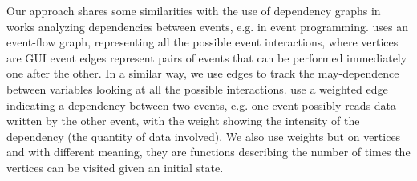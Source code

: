 %
Our approach shares some similarities with the use of dependency graphs in works analyzing dependencies between events, e.g. in event programming. \citet{memon2007event} uses an event-flow graph, representing all the possible event interactions, where vertices are GUI event edges represent pairs of events that can be performed immediately one after the other. In a similar way, we use edges to track the may-dependence between variables looking at all the possible interactions. 
\citet{arlt2012lightweight} use a weighted edge indicating a dependency between two events, e.g. one event possibly reads data written by the other event, with the weight showing the intensity of the dependency (the quantity of data involved). We also use weights but on vertices and with different meaning, they are functions describing the number of times the vertices can be visited given an initial state.
%
%
%
